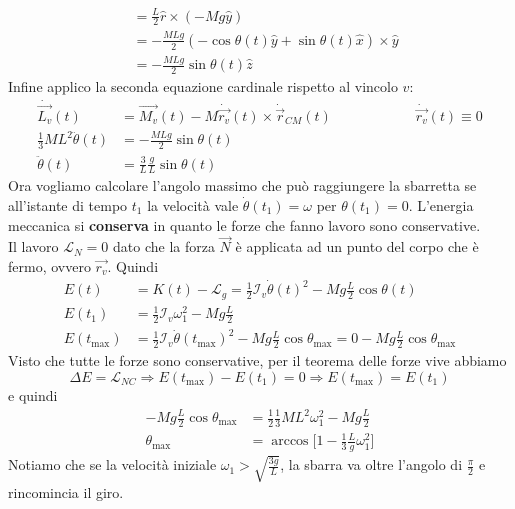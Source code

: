 \begin{example}
\begin{equation*}
\begin{split}
			& = \frac{L}{2}\widehat{r}\times (-Mg\widehat{y}) \\
			& = -\frac{MLg}{2}(-\cos\theta(t)\widehat{y}+\sin\theta(t)\widehat{x}) \times \widehat{y} \\
			& = -\frac{MLg}{2}\sin\theta(t) \widehat{z}
		\end{split}
	\end{equation*}
	Infine applico la seconda equazione cardinale rispetto al vincolo $v$:
	\begin{equation*}
		\begin{split}
			\dot{\vec{L_v}}(t) &= \vec{M_v}(t) - M\dot{\vec{r_v}}(t) \times \dot{\vec{r}}_{CM}(t) \qquad\qquad\qquad \dot{\vec{r_v}}(t) \equiv 0 \\
			\frac{1}{3}ML^2 \ddot{\theta}(t) & = -\frac{MLg}{2}\sin\theta(t) \\
			\ddot{\theta}(t) &= \frac{3}{L}\frac{g}{L}\sin\theta(t)
		\end{split}
	\end{equation*}
	Ora vogliamo calcolare l'angolo massimo che può raggiungere la sbarretta se all'istante di tempo $t_1$ la velocità vale $\dot{\theta}(t_1) = \omega$ per $\theta(t_1) =0$. L'energia meccanica si \textbf{conserva} in quanto le forze che fanno lavoro sono conservative.\\
	Il lavoro $\mathcal{L}_N=0$ dato che la forza $\vec{N}$ è applicata ad un punto del corpo che è fermo, ovvero $\vec{r_v}$. Quindi
	\begin{align*}
		E(t) & = K(t) - \mathcal{L}_g= \frac{1}{2}\mathcal{I}_v\dot{\theta}(t)^2 - Mg\frac{L}{2}\cos\theta(t) \\
		E(t_1) & = \frac{1}{2}\mathcal{I}_v \omega_1^2 - Mg\frac{L}{2} \\
		E(t_{\max}) & =\frac{1}{2}\mathcal{I}_v\dot{\theta}(t_{\max})^2 - Mg\frac{L}{2}\cos\theta_{\max} = 0-Mg\frac{L}{2}\cos\theta_{\max}
	\end{align*}
	Visto che tutte le forze sono conservative, per il teorema delle forze vive abbiamo
	\begin{equation*}
		\Delta E = \mathcal{L}_{NC} \Longrightarrow E(t_{\max}) - E(t_1) = 0 \Longrightarrow E(t_{\max}) = E(t_1)
	\end{equation*}
	e quindi
	\begin{align*}
		-Mg\frac{L}{2}\cos\theta_{\max} & = \frac{1}{2}\frac{1}{3}ML^2\omega_1^2 - Mg\frac{L}{2} \\
		\theta_{\max} & = \arccos\bigg[1-\frac{1}{3}\frac{L}{g}\omega_1^2\bigg]
	\end{align*}
	Notiamo che se la velocità iniziale $\omega_1 > \sqrt{\frac{3g}{L}}$, la sbarra va oltre l'angolo di $\frac{\pi}{2}$ e rincomincia il giro.
\end{example}

